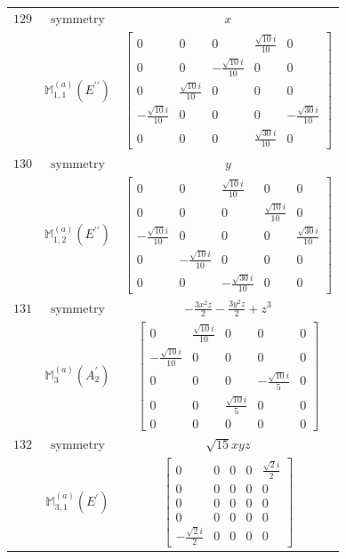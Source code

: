 \documentclass[fleqn,8pt,landscape]{jsarticle}
\begin{document}
\begin{longtable}{ccc}
$ 129 $ & $ \text{symmetry} $ & $ x $ \\
$  $ & $ \mathbb{M}_{1,1}^{(a)}(E^{\prime\prime}) $ & $ \begin{bmatrix} 0 & 0 & 0 & \frac{\sqrt{10} i}{10} & 0 \\ 0 & 0 & - \frac{\sqrt{10} i}{10} & 0 & 0 \\ 0 & \frac{\sqrt{10} i}{10} & 0 & 0 & 0 \\ - \frac{\sqrt{10} i}{10} & 0 & 0 & 0 & - \frac{\sqrt{30} i}{10} \\ 0 & 0 & 0 & \frac{\sqrt{30} i}{10} & 0 \end{bmatrix} $ \\ \hline
$ 130 $ & $ \text{symmetry} $ & $ y $ \\
$  $ & $ \mathbb{M}_{1,2}^{(a)}(E^{\prime\prime}) $ & $ \begin{bmatrix} 0 & 0 & \frac{\sqrt{10} i}{10} & 0 & 0 \\ 0 & 0 & 0 & \frac{\sqrt{10} i}{10} & 0 \\ - \frac{\sqrt{10} i}{10} & 0 & 0 & 0 & \frac{\sqrt{30} i}{10} \\ 0 & - \frac{\sqrt{10} i}{10} & 0 & 0 & 0 \\ 0 & 0 & - \frac{\sqrt{30} i}{10} & 0 & 0 \end{bmatrix} $ \\ \hline
$ 131 $ & $ \text{symmetry} $ & $ - \frac{3 x^{2} z}{2} - \frac{3 y^{2} z}{2} + z^{3} $ \\
$  $ & $ \mathbb{M}_{3}^{(a)}(A_{2}^{\prime}) $ & $ \begin{bmatrix} 0 & \frac{\sqrt{10} i}{10} & 0 & 0 & 0 \\ - \frac{\sqrt{10} i}{10} & 0 & 0 & 0 & 0 \\ 0 & 0 & 0 & - \frac{\sqrt{10} i}{5} & 0 \\ 0 & 0 & \frac{\sqrt{10} i}{5} & 0 & 0 \\ 0 & 0 & 0 & 0 & 0 \end{bmatrix} $ \\ \hline
$ 132 $ & $ \text{symmetry} $ & $ \sqrt{15} x y z $ \\
$  $ & $ \mathbb{M}_{3,1}^{(a)}(E^{\prime}) $ & $ \begin{bmatrix} 0 & 0 & 0 & 0 & \frac{\sqrt{2} i}{2} \\ 0 & 0 & 0 & 0 & 0 \\ 0 & 0 & 0 & 0 & 0 \\ 0 & 0 & 0 & 0 & 0 \\ - \frac{\sqrt{2} i}{2} & 0 & 0 & 0 & 0 \end{bmatrix} $ \\ \hline

\end{longtable}
\end{document}
